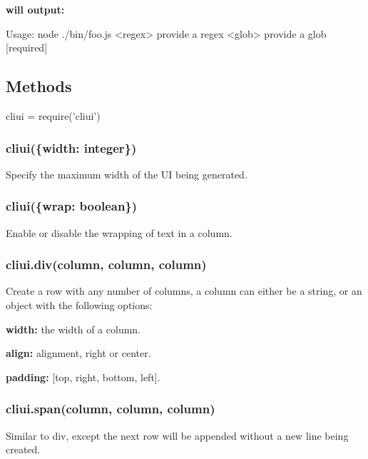 {\bfseries will output\+:}


\begin{DoxyCode}
Usage: node ./bin/foo.js
  <regex>  provide a regex
  <glob>   provide a glob          [required]
\end{DoxyCode}


\subsection*{Methods}


\begin{DoxyCode}
cliui = require('cliui')
\end{DoxyCode}


\subsubsection*{cliui(\{width\+: integer\})}

Specify the maximum width of the UI being generated.

\subsubsection*{cliui(\{wrap\+: boolean\})}

Enable or disable the wrapping of text in a column.

\subsubsection*{cliui.\+div(column, column, column)}

Create a row with any number of columns, a column can either be a string, or an object with the following options\+:


\begin{DoxyItemize}
\item {\bfseries width\+:} the width of a column.
\item {\bfseries align\+:} alignment, {\ttfamily right} or {\ttfamily center}.
\item {\bfseries padding\+:} {\ttfamily \mbox{[}top, right, bottom, left\mbox{]}}.
\end{DoxyItemize}

\subsubsection*{cliui.\+span(column, column, column)}

Similar to {\ttfamily div}, except the next row will be appended without a new line being created. 
